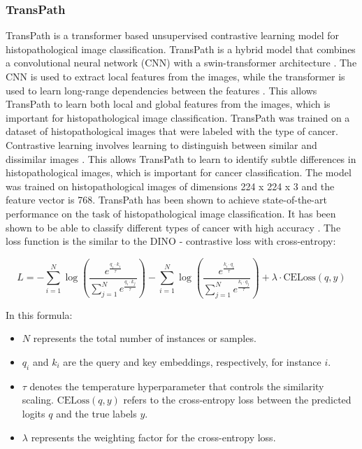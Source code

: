 \documentclass[12pt,a4paper]{article}
\begin{document}
\subsubsection{TransPath}
TransPath is a transformer based unsupervised contrastive learning model for histopathological image classification. TransPath is a hybrid model that combines a convolutional neural network (CNN) with a swin-transformer architecture \cite{WANG2022102559}. The CNN is used to extract local features from the images, while the transformer is used to learn long-range dependencies between the features \cite{WANG2022102559}. This allows TransPath to learn both local and global features from the images, which is important for histopathological image classification. TransPath was trained on a dataset of histopathological images that were labeled with the type of cancer. Contrastive learning involves learning to distinguish between similar and dissimilar images \cite{WANG2022102559}. This allows TransPath to learn to identify subtle differences in histopathological images, which is important for cancer classification. The model was trained on histopathological images of dimensions 224 x 224 x 3 and the feature vector is 768. TransPath has been shown to achieve state-of-the-art performance on the task of histopathological image classification. It has been shown to be able to classify different types of cancer with high accuracy \cite{WANG2022102559}. The loss function is the similar to the DINO - contrastive loss with cross-entropy:

\[
L = -\sum_{i=1}^{N} \log \left( \frac{e^{\frac{q_{i} \cdot k_{i}}{\tau}}}{\sum_{j=1}^{N} e^{\frac{q_{i} \cdot k_{j}}{\tau}}} \right) - \sum_{i=1}^{N} \log \left( \frac{e^{\frac{k_{i} \cdot q_{i}}{\tau}}}{\sum_{j=1}^{N} e^{\frac{k_{i} \cdot q_{j}}{\tau}}} \right) + \lambda \cdot \mathrm{CELoss}(q, y)
\]

In this formula:
\begin{itemize}
\item \(N\) represents the total number of instances or samples.
\item \(q_i\) and \(k_i\) are the query and key embeddings, respectively, for instance \(i\).
\item \(\tau\) denotes the temperature hyperparameter that controls the similarity scaling.
\(\text{CELoss}(q, y)\) refers to the cross-entropy loss between the predicted logits \(q\) and the true labels \(y\).
\item \(\lambda\) represents the weighting factor for the cross-entropy loss.
\end{itemize}
\end{document}
